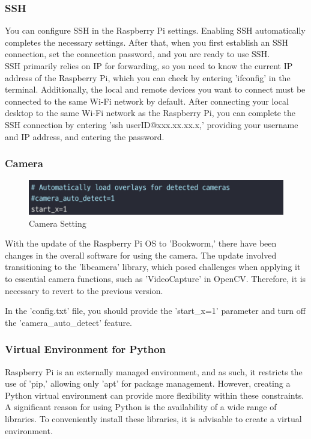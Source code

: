 \subsubsection{\textbf{SSH}}
You can configure SSH in the Raspberry Pi settings. Enabling SSH automatically completes the necessary settings. After that, when you first establish an SSH connection, set the connection password, and you are ready to use SSH.
\\

SSH primarily relies on IP for forwarding, so you need to know the current IP address of the Raspberry Pi, which you can check by entering 'ifconfig' in the terminal. Additionally, the local and remote devices you want to connect must be connected to the same Wi-Fi network by default.
After connecting your local desktop to the same Wi-Fi network as the Raspberry Pi, you can complete the SSH connection by entering 'ssh userID@xxx.xx.xx.x,' providing your username and IP address, and entering the password.\\

\subsubsection{\textbf{Camera}}
\begin{figure}[h]
    \centering
    \includegraphics[width=1\linewidth]{images/camera.png}
    \caption{Camera Setting}
    \label{fig:enter-label}
\end{figure}
With the update of the Raspberry Pi OS to 'Bookworm,' there have been changes in the overall software for using the camera. The update involved transitioning to the 'libcamera' library, which posed challenges when applying it to essential camera functions, such as 'VideoCapture' in OpenCV. Therefore, it is necessary to revert to the previous version.

In the 'config.txt' file, you should provide the 'start\_x=1' parameter and turn off the 'camera\_auto\_detect' feature.\\

\subsubsection{\textbf{Virtual Environment for Python}}
Raspberry Pi is an externally managed environment, and as such, it restricts the use of 'pip,' allowing only 'apt' for package management. However, creating a Python virtual environment can provide more flexibility within these constraints. A significant reason for using Python is the availability of a wide range of libraries. To conveniently install these libraries, it is advisable to create a virtual environment.\\


